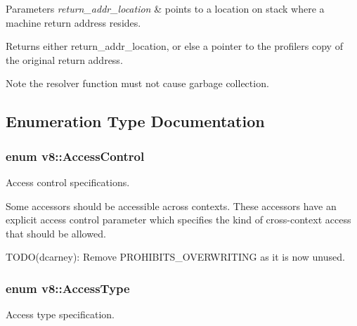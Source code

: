 \begin{DoxyParams}{Parameters}
{\em return\+\_\+addr\+\_\+location} & points to a location on stack where a machine return address resides. \\
\hline
\end{DoxyParams}
\begin{DoxyReturn}{Returns}
either return\+\_\+addr\+\_\+location, or else a pointer to the profiler\textquotesingle{}s copy of the original return address.
\end{DoxyReturn}
\begin{DoxyNote}{Note}
the resolver function must not cause garbage collection. 
\end{DoxyNote}


\subsection{Enumeration Type Documentation}
\subsubsection[{\texorpdfstring{Access\+Control}{AccessControl}}]{\setlength{\rightskip}{0pt plus 5cm}enum {\bf v8\+::\+Access\+Control}}\hypertarget{namespacev8_a31d8355cb043d7d2dda3f4a52760b64e}{}\label{namespacev8_a31d8355cb043d7d2dda3f4a52760b64e}
Access control specifications.

Some accessors should be accessible across contexts. These accessors have an explicit access control parameter which specifies the kind of cross-\/context access that should be allowed.

T\+O\+D\+O(dcarney)\+: Remove P\+R\+O\+H\+I\+B\+I\+T\+S\+\_\+\+O\+V\+E\+R\+W\+R\+I\+T\+I\+NG as it is now unused. 
\subsubsection[{\texorpdfstring{Access\+Type}{AccessType}}]{\setlength{\rightskip}{0pt plus 5cm}enum {\bf v8\+::\+Access\+Type}}\hypertarget{namespacev8_add8bef6469c5b94706584124e610046c}{}\label{namespacev8_add8bef6469c5b94706584124e610046c}
Access type specification. 

